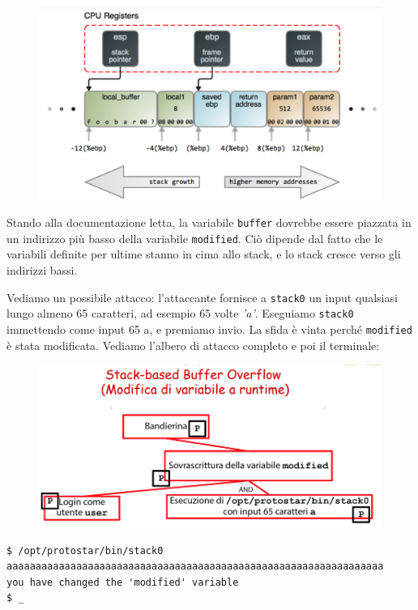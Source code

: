 \begin{figure}[hbpt!]
    \centering
    \includegraphics[width= 0.6 \textwidth]{./Images/cap7/7.2.png}
\end{figure}
\FloatBarrier

Stando alla documentazione letta, la variabile \texttt{buffer} dovrebbe essere piazzata in un indirizzo più basso della variabile \texttt{modified}. Ciò dipende dal fatto che le variabili definite per ultime stanno in cima allo stack, e lo stack cresce verso gli indirizzi bassi. 

\vspace{5mm}

Vediamo un possibile attacco: l'attaccante fornisce a \texttt{stack0} un input qualsiasi lungo almeno 65 caratteri, ad esempio 65 volte \textit{'a'}. Eseguiamo \texttt{stack0} immettendo come input 65 a, e premiamo invio. La sfida è vinta perché \texttt{modified} è stata modificata. Vediamo l'albero di attacco completo e poi il terminale:

\begin{figure}[hbpt!]
    \centering
    \includegraphics[width= 0.6 \textwidth]{./Images/cap7/7.3.png}
\end{figure}
\FloatBarrier

\begin{mdframed}[backgroundcolor=white!20,shadow=false]
\begin{lstlisting}
$ /opt/protostar/bin/stack0
aaaaaaaaaaaaaaaaaaaaaaaaaaaaaaaaaaaaaaaaaaaaaaaaaaaaaaaaaaaaaaaaa
you have changed the 'modified' variable
$ _
\end{lstlisting}
\end{mdframed}

